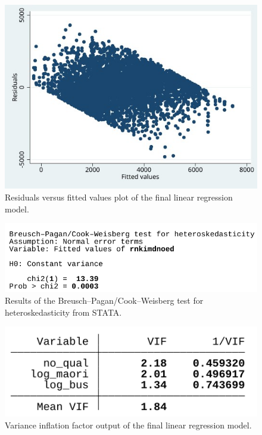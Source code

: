 \documentclass[
  letterpaper,
  DIV=11,
  numbers=noendperiod,
  oneside]{scrartcl}
\begin{document}
\begin{figure}

{\centering \includegraphics{rvfplot.jpg}

}

\caption{\label{fig-rvf}Residuals versus fitted values plot of the final
linear regression model.}

\end{figure}

\begin{figure}

{\centering \includegraphics{hettest.png}

}

\caption{\label{fig-hettest}Results of the Breusch--Pagan/Cook--Weisberg
test for heteroskedasticity from STATA.}

\end{figure}

\begin{figure}

{\centering \includegraphics{vif.png}

}

\caption{\label{fig-vif}Variance inflation factor output of the final
linear regression model.}

\end{figure}
\end{document}

